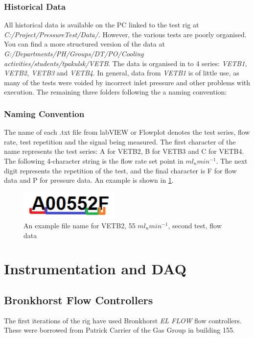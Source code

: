 \documentclass{report}
\begin{document}
\subsubsection{Historical Data}
All historical data is available on the PC linked to the test rig at \textit{C:/Project/PressureTest/Data/}. However, the various tests are poorly organised. You can find a more structured version of the data at \textit{G:/Departments/PH/Groups/DT/PO/Cooling activities/students/tpakulsk/VETB}. The data is organised in to 4 series: \textit{VETB1, VETB2, VETB3} and \textit{VETB4}. In general, data from \textit{VETB1} is of little use, as many of the tests were voided by incorrect inlet pressure and other problems with execution. The remaining three folders following the a naming convention:\\
\subsubsection{Naming Convention}
The name of each .txt file from labVIEW or Flowplot denotes the test series, flow rate, test repetition and the signal being measured. The first character of the name represents the test series: A for VETB2, B for VETB3 and C for VETB4. The following 4-character string is the flow rate set point in $ml_nmin^{-1}$. The next digit represents the repetition of the test, and the final character is F for flow data and P for pressure data. An example is shown in \ref{namingConvention}.

\begin{figure}[h]
\includegraphics[width = 5cm]{namingConvention}
\caption{An example file name for VETB2, 55 $ml_nmin^{-1}$, second test, flow data}
\label{namingConvention}
\end{figure}



\section{Instrumentation and DAQ}
\subsection{Bronkhorst Flow Controllers}
The first iterations of the rig have used Bronkhorst \textit{EL FLOW} flow controllers. These were borrowed from Patrick Carrier of the Gas Group in building 155. 
\end{document}
